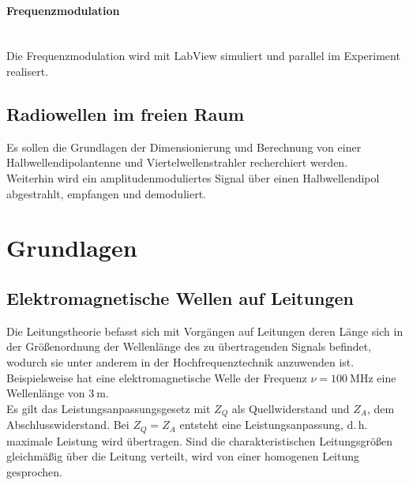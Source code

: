 \documentclass[a4paper,twoside,final]{article}
\begin{document}
\paragraph{Frequenzmodulation}$~$\\
Die Frequenzmodulation wird mit LabView simuliert und parallel im Experiment realisert.

\subsection{Radiowellen im freien Raum}
Es sollen die Grundlagen der Dimensionierung und Berechnung von einer Halbwellendipolantenne und Viertelwellenstrahler recherchiert werden.\\
Weiterhin wird ein amplitudenmoduliertes Signal über einen Halbwellendipol abgestrahlt, empfangen und demoduliert. \\


\newpage
\section{Grundlagen} \label{sec:Grundlagen}

\subsection{Elektromagnetische Wellen auf Leitungen}
Die Leitungstheorie befasst sich mit Vorgängen auf Leitungen deren Länge sich in der Größenordnung der Wellenlänge
des zu übertragenden Signals befindet, wodurch sie unter anderem in der Hochfrequenztechnik anzuwenden ist. Beispielsweise hat eine elektromagnetische Welle der Frequenz $\nu = \SI{100}{\mega\hertz}$ eine Wellenlänge von $\SI{3}{\metre}$. \\
Es gilt das Leistungsanpassungsgesetz mit $Z_Q$ als Quellwiderstand und $Z_A$, dem Abschlusswiderstand. Bei $Z_Q = Z_A$ entsteht eine Leistungsanpassung, d.\,h. maximale Leistung wird übertragen. Sind die charakteristischen Leitungsgrößen gleichmäßig über die Leitung verteilt, wird von einer homogenen Leitung gesprochen.
\end{document}
